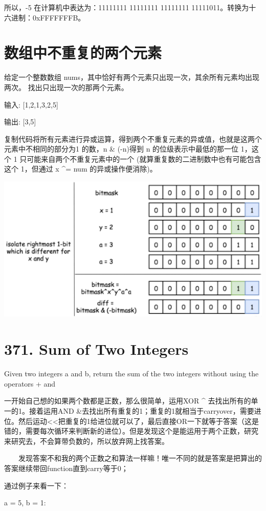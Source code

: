 \documentclass[9pt, b5paaper]{book}
\begin{document}
所以，-5 在计算机中表达为：11111111 11111111 11111111 11111011。转换为十六进制：0xFFFFFFFB。

\section{数组中不重复的两个元素}
\label{sec-10-2}
给定一个整数数组 nums，其中恰好有两个元素只出现一次，其余所有元素均出现两次。 找出只出现一次的那两个元素。

输入: [1,2,1,3,2,5]

输出: [3,5]

复制代码将所有元素进行异或运算，得到两个不重复元素的异或值，也就是这两个元素中不相同的部分为1 的数，n \& (-n)得到 n 的位级表示中最低的那一位 1，这个 1 只可能来自两个不重复元素中的一个 (就算重复数的二进制数中也有可能包含这个 1，但通过 x \^{}= num 的异或操作便消除)。

\includegraphics[width=.9\linewidth]{./pic/twoNumberArray.png}

\section{371. Sum of Two Integers}
\label{sec-10-3}
Given two integers a and b, return the sum of the two integers without using the operators + and


一开始自己想的如果两个数都是正数，那么很简单，运用XOR  \^{} 去找出所有的单一的1。接着运用AND \&去找出所有重复的1；重复的1就相当于carryover，需要进位。然后运动<<把重复的1给进位就可以了，最后直接OR一下就等于答案（这是错的，需要每次循环来判断新的进位）。但是发现这个是能运用于两个正数，研究来研究去，不会算带负数的，所以放弃网上找答案。

　　发现答案不和我的两个正数之和算法一样嘛！唯一不同的就是答案是把算出的答案继续带回function直到carry等于0；

通过例子来看一下：

a = 5, b = 1:
\end{document}
